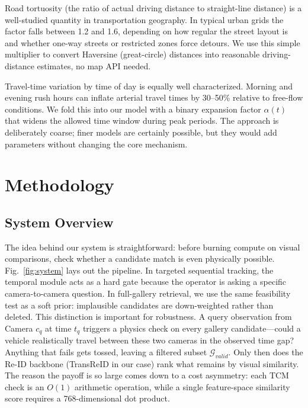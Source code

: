 \documentclass{ijitcs}
\newcommand{\rev}[1]{#1}
\begin{document}
Road tortuosity (the ratio of actual driving distance to straight-line distance) is a well-studied quantity in transportation geography. In typical urban grids the factor falls between 1.2 and 1.6, depending on how regular the street layout is and whether one-way streets or restricted zones force detours. We use this simple multiplier to convert Haversine (great-circle) distances into reasonable driving-distance estimates, no map API needed.

Travel-time variation by time of day is equally well characterized. Morning and evening rush hours can inflate arterial travel times by 30--50\% relative to free-flow conditions. We fold this into our model with a binary expansion factor $\alpha(t)$ that widens the allowed time window during peak periods. The approach is deliberately coarse; finer models are certainly possible, but they would add parameters without changing the core mechanism.


\section{Methodology}

\subsection{System Overview}
The idea behind our system is straightforward: before burning compute on visual comparisons, check whether a candidate match is even physically possible. \rev{Fig.~\ref{fig:system} lays out the pipeline. In targeted sequential tracking, the temporal module acts as a hard gate because the operator is asking a specific camera-to-camera question. In full-gallery retrieval, we use the same feasibility test as a soft prior: implausible candidates are down-weighted rather than deleted. This distinction is important for robustness.} A query observation from Camera $c_q$ at time $t_q$ triggers a physics check on every gallery candidate---could a vehicle realistically travel between these two cameras in the observed time gap? Anything that fails gets tossed, leaving a filtered subset $\mathcal{G}_{valid}$. Only then does the Re-ID backbone (TransReID in our case) rank what remains by visual similarity. The reason the payoff is so large comes down to a cost asymmetry: each TCM check is an $O(1)$ arithmetic operation, while a single feature-space similarity score requires a 768-dimensional dot product.
\end{document}
